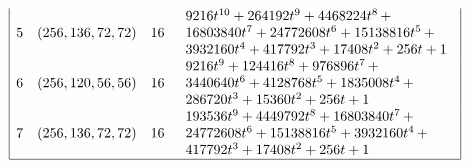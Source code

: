 \begin{table}[!bhpt]
\begin{align*}
\begin{array}{|cccl|}
5 &
(256, 136, 72, 72) &
16 &
\begin{array}{l}
9216t^{10} + 264192t^{9} + 4468224t^{8}
\,+
\\
 16803840t^{7} + 24772608t^{6} + 15138816t^{5}
\,+
\\
 3932160t^{4} + 417792t^{3} + 17408t^{2} + 256t + 1
\end{array}
\\
6 &
(256, 120, 56, 56) &
16 &
\begin{array}{l}
9216t^{9} + 124416t^{8} + 976896t^{7}
\,+
\\
 3440640t^{6} + 4128768t^{5} + 1835008t^{4}
\,+
\\
 286720t^{3} + 15360t^{2} + 256t + 1
\end{array}
\\
7 &
(256, 136, 72, 72) &
16 &
\begin{array}{l}
193536t^{9} + 4449792t^{8} + 16803840t^{7}
\,+
\\
 24772608t^{6} + 15138816t^{5} + 3932160t^{4}
\,+
\\
 417792t^{3} + 17408t^{2} + 256t + 1
\end{array}
\\
\hline
\end{array}
\end{align*}
\caption{$[f_{8,9}]$ extended Cayley classes.}
\label{tab-c8_9_EC_classes}
\end{table}

